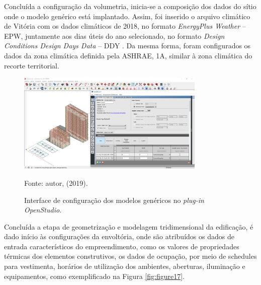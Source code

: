 \noindent Concluída a configuração da volumetria, inicia-se a composição dos dados do sítio onde o modelo genérico está implantado. Assim, foi inserido o arquivo climático de Vitória com os dados climáticos de 2018, no formato \textit{EnergyPlus Weather} – EPW, juntamente aos dias úteis do ano selecionado, no formato \textit{Design Conditions Design Days Data} – DDY \cite{InstitutoNacionaldeMetereologia-INMET2018}. Da mesma forma, foram configurados os dados da zona climática definida pela ASHRAE, 1A, similar à zona climática do recorte territorial.\vspace*{-0.25cm}
\begin{figure}[H]
    \centering
    \caption{Interface de configuração dos modelos genéricos no \textit{plug-in OpenStudio}.}
    \includegraphics[width=0.8\textwidth]{figures/fig16-OS.png}
    \begin{flushleft}
        \par \small Fonte: autor, (2019).
    \end{flushleft}
    \label{fig:figure16}
\end{figure}
\noindent Concluída a etapa de geometrização e modelagem tridimensional da edificação, é dado início às configurações da envoltória, onde são atribuídos os dados de entrada característicos do empreendimento, como os valores de propriedades térmicas dos elementos construtivos, os dados de ocupação, por meio de schedules para vestimenta, horários de utilização dos ambientes, aberturas, iluminação e equipamentos, como exemplificado na Figura \ref{fig:figure17}.\vspace*{-0.25cm}
